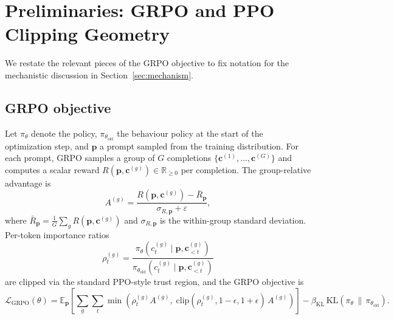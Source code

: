 \documentclass[journal,onecolumn,11pt]{IEEEtran}
\newcommand{\E}{\mathbb{E}}
\newcommand{\KL}{\mathrm{KL}}
\begin{document}
\section{Preliminaries: GRPO and PPO Clipping Geometry}
\label{sec:preliminaries}

We restate the relevant pieces of the GRPO objective to fix notation for the
mechanistic discussion in Section~\ref{sec:mechanism}.

\subsection{GRPO objective}
Let $\pi_\theta$ denote the policy, $\pi_{\theta_{\text{old}}}$ the
behaviour policy at the start of the optimization step, and $\mathbf{p}$ a
prompt sampled from the training distribution. For each prompt, GRPO samples
a group of $G$ completions
$\{\mathbf{c}^{(1)},\ldots,\mathbf{c}^{(G)}\}$ and computes a scalar reward
$R(\mathbf{p},\mathbf{c}^{(g)})\in\mathbb{R}_{\geq 0}$ per completion. The
group-relative advantage is
\begin{equation}
A^{(g)} = \frac{R(\mathbf{p},\mathbf{c}^{(g)}) - \bar{R}_{\mathbf{p}}}%
              {\sigma_{R,\mathbf{p}} + \varepsilon},
\label{eq:advantage}
\end{equation}
where $\bar{R}_{\mathbf{p}} = \tfrac{1}{G}\sum_g R(\mathbf{p},\mathbf{c}^{(g)})$
and $\sigma_{R,\mathbf{p}}$ is the within-group standard deviation. Per-token
importance ratios
\begin{equation}
\rho_t^{(g)} = \frac{\pi_\theta(c^{(g)}_t \mid \mathbf{p}, \mathbf{c}^{(g)}_{<t})}%
                      {\pi_{\theta_{\text{old}}}(c^{(g)}_t \mid \mathbf{p}, \mathbf{c}^{(g)}_{<t})}
\end{equation}
are clipped via the standard PPO-style trust region, and the GRPO objective is
\begin{equation}
\mathcal{L}_{\text{GRPO}}(\theta) =
\E_{\mathbf{p}}\!\left[\sum_g \sum_t \min\!\left(\rho_t^{(g)} A^{(g)},\;
                            \mathrm{clip}(\rho_t^{(g)},1-\epsilon,1+\epsilon)\,
                            A^{(g)}\right)\right]
- \beta_{\text{KL}}\,\KL(\pi_\theta\,\|\,\pi_{\theta_{\text{old}}}).
\label{eq:grpo}
\end{equation}
\end{document}
